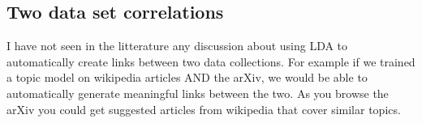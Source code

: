 \documentclass[11pt]{article}
\begin{document}

		


    \subsection{Two data set correlations}

        I have not seen in the litterature any discussion about using LDA to automatically
        create links between two data collections.
        For example if we trained a topic model on wikipedia articles AND the arXiv,
        we would be able to automatically generate meaningful links between the two.
        As you browse the arXiv you could get suggested articles from wikipedia that cover similar topics.

	
		
\end{document}
